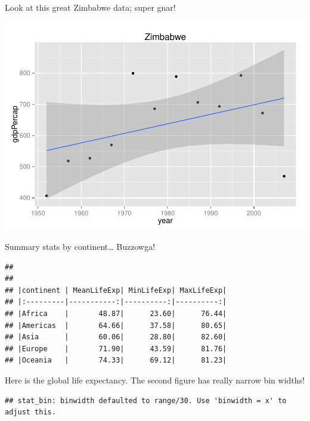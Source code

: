 \documentclass[]{article}
\begin{document}
Look at this great Zimbabwe data; super gnar!

\includegraphics{GapMinder_rMarkdown_files/figure-latex/unnamed-chunk-3.pdf}

Summary stats by continent\ldots{} Buzzowga!

\begin{verbatim}
## 
## 
## |continent | MeanLifeExp| MinLifeExp| MaxLifeExp|
## |:---------|-----------:|----------:|----------:|
## |Africa    |       48.87|      23.60|      76.44|
## |Americas  |       64.66|      37.58|      80.65|
## |Asia      |       60.06|      28.80|      82.60|
## |Europe    |       71.90|      43.59|      81.76|
## |Oceania   |       74.33|      69.12|      81.23|
\end{verbatim}

Here is the global life expectancy. The second figure has really narrow
bin widths!

\begin{verbatim}
## stat_bin: binwidth defaulted to range/30. Use 'binwidth = x' to adjust this.
\end{verbatim}
\end{document}
